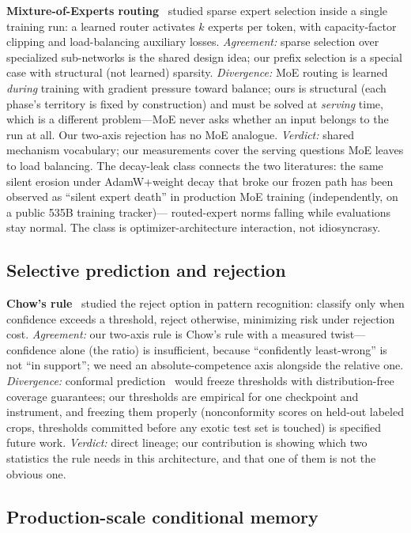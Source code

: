 \documentclass[11pt]{article}
\theoremstyle{definition}\newtheorem{definition}{Definition}
\theoremstyle{remark}\newtheorem{remark}{Remark}
\begin{document}
\textbf{Mixture-of-Experts routing}~\cite{shazeer,switch,gshard} studied sparse expert
selection inside a single training run: a learned router activates $k$ experts per token,
with capacity-factor clipping and load-balancing auxiliary losses. \emph{Agreement:}
sparse selection over specialized sub-networks is the shared design idea; our prefix
selection is a special case with structural (not learned) sparsity. \emph{Divergence:}
MoE routing is learned \emph{during} training with gradient pressure toward balance; ours
is structural (each phase's territory is fixed by construction) and must be solved at
\emph{serving} time, which is a different problem---MoE never asks whether an input belongs
to the run at all. Our two-axis rejection has no MoE analogue. \emph{Verdict:} shared
mechanism vocabulary; our measurements cover the serving questions MoE leaves to load
balancing. The decay-leak class connects the two literatures: the same silent erosion
under AdamW+weight decay that broke our frozen path has been observed as ``silent expert
death'' in production MoE training (independently, on a public 535B training tracker)---
routed-expert norms falling while evaluations stay normal. The class is
optimizer-architecture interaction, not idiosyncrasy.

\subsection{Selective prediction and rejection}
\label{sec:prior:reject}

\textbf{Chow's rule}~\cite{chow} studied the reject option in pattern recognition:
classify only when confidence exceeds a threshold, reject otherwise, minimizing risk
under rejection cost. \emph{Agreement:} our two-axis rule is Chow's rule with a measured
twist---confidence alone (the ratio) is insufficient, because ``confidently least-wrong''
is not ``in support''; we need an absolute-competence axis alongside the relative one.
\emph{Divergence:} conformal prediction~\cite{conformal} would freeze thresholds with
distribution-free coverage guarantees; our thresholds are empirical for one checkpoint and
instrument, and freezing them properly (nonconformity scores on held-out labeled crops,
thresholds committed before any exotic test set is touched) is specified future work.
\emph{Verdict:} direct lineage; our contribution is showing which two statistics the rule
needs in this architecture, and that one of them is not the obvious one.

\subsection{Production-scale conditional memory}
\label{sec:prior:engram}
\end{document}
